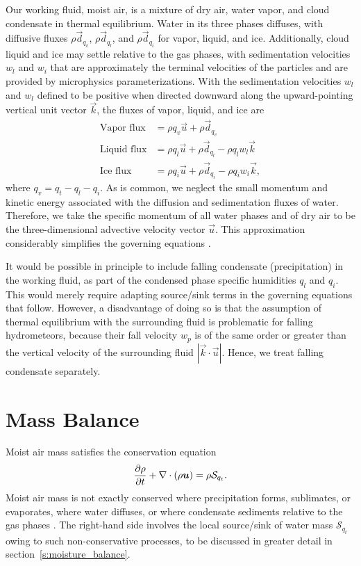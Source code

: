\documentclass{report}
\begin{document}
Our working fluid, moist air, is a mixture of dry air, water vapor, and cloud condensate in thermal equilibrium. Water in its three phases diffuses, with diffusive fluxes $\rho \vec{d}_{q_v}$, $\rho \vec{d}_{q_l}$, and $\rho \vec{d}_{q_i}$ for vapor, liquid, and ice. Additionally, cloud liquid and ice may settle relative to the gas phases, with sedimentation velocities $w_l$ and $w_i$ that are approximately the terminal velocities of the particles and are provided by microphysics parameterizations. With the sedimentation velocities $w_l$ and $w_l$ defined to be positive when directed downward along the upward-pointing vertical unit vector $\vec{k}$, the fluxes of vapor, liquid, and ice are
\begin{subequations}
\begin{align}
    \text{Vapor flux}  &= \rho q_v \vec{u}  + \rho \vec{d}_{q_v}\\
    \text{Liquid flux}  &= \rho q_l \vec{u}  + \rho \vec{d}_{q_l} - \rho q_l w_l  \vec{k}\\
    \text{Ice flux} &= \rho q_i \vec{u} + \rho \vec{d}_{q_i} - \rho q_i w_i  \vec{k},
\end{align}
\end{subequations}
where $q_v = q_t - q_l - q_i$. As is common, we neglect the small momentum and kinetic energy associated with the diffusion and sedimentation fluxes of water. Therefore, we take the specific momentum of all water phases and of dry air to be the three-dimensional advective velocity vector $\vec{u}$. This approximation considerably simplifies the governing equations \citep{Romps08a}.

It would be possible in principle to include falling condensate (precipitation) in the working fluid, as part of the condensed phase specific humidities $q_l$ and $q_i$. This would merely require adapting source/sink terms in the governing equations that follow. However, a disadvantage of doing so is that the assumption of thermal equilibrium with the surrounding fluid is problematic for falling hydrometeors, because their fall velocity $w_{p}$ is of the same order or greater than the vertical velocity of the surrounding fluid $|\vec{k} \cdot \vec{u}|$. Hence, we treat falling condensate separately.

\section{Mass Balance}

Moist air mass satisfies the conservation equation
\begin{equation}
\frac{\partial \rho}{\partial t} + \nabla \cdot (\rho\boldsymbol{{u}}) = \rho \mathcal{S}_{q_t}.
\label{eq:governing_equations/mass}
\end{equation}
Moist air mass is not exactly conserved where precipitation forms, sublimates, or evaporates, where water diffuses, or where condensate sediments relative to the gas phases \citep{Bott08a, Romps08a}. The  right-hand side involves the local source/sink of water mass $\mathcal{S}_{q_t}$ owing to such non-conservative processes, to be discussed in greater detail in section~\ref{s:moisture_balance}.
\end{document}
